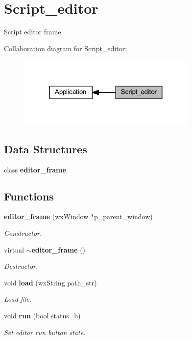 \section{Script\+\_\+editor}
\label{group___script__editor}


Script editor frame.  


Collaboration diagram for Script\+\_\+editor\+:
\nopagebreak
\begin{figure}[H]
\begin{center}
\leavevmode
\includegraphics[width=252pt]{group___script__editor}
\end{center}
\end{figure}
\subsection*{Data Structures}
\begin{DoxyCompactItemize}
\item 
class \textbf{ editor\+\_\+frame}
\end{DoxyCompactItemize}
\subsection*{Functions}
\begin{DoxyCompactItemize}
\item 
\textbf{ editor\+\_\+frame} (wx\+Window $\ast$p\+\_\+parent\+\_\+window)
\begin{DoxyCompactList}\small\item\em Constructor. \end{DoxyCompactList}\item 
virtual \textbf{ $\sim$editor\+\_\+frame} ()
\begin{DoxyCompactList}\small\item\em Destructor. \end{DoxyCompactList}\item 
void \textbf{ load} (wx\+String path\+\_\+str)
\begin{DoxyCompactList}\small\item\em Load file. \end{DoxyCompactList}\item 
void \textbf{ run} (bool status\+\_\+b)
\begin{DoxyCompactList}\small\item\em Set editor run button state. \end{DoxyCompactList}\end{DoxyCompactItemize}


